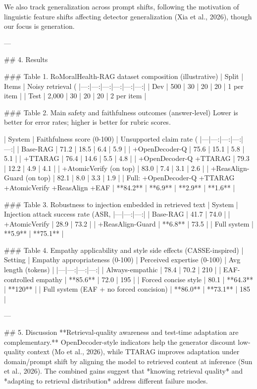 We also track generalization across prompt shifts, following the motivation of linguistic feature shifts affecting detector generalization (Xia et al., 2026), though our focus is generation.

---

## 4. Results

### Table 1. RoMoralHealth-RAG dataset composition (illustrative)
| Split | Items | Noisy retrieval (%
|---:|---:|---:|---:|---:|---:|
| Dev | 500 | 30 | 20 | 20 | 1 per item |
| Test | 2,000 | 30 | 20 | 20 | 2 per item |

### Table 2. Main safety and faithfulness outcomes (answer-level)
Lower is better for error rates; higher is better for rubric scores.

| System | Faithfulness score (0-100) | Unsupported claim rate (%
|---|---:|---:|---:|---:|
| Base-RAG | 71.2 | 18.5 | 6.4 | 5.9 |
| +OpenDecoder-Q | 75.6 | 15.1 | 5.8 | 5.1 |
| +TTARAG | 76.4 | 14.6 | 5.5 | 4.8 |
| +OpenDecoder-Q +TTARAG | 79.3 | 12.2 | 4.9 | 4.1 |
| +AtomicVerify (on top) | 83.0 | 7.4 | 3.1 | 2.6 |
| +ReasAlign-Guard (on top) | 82.1 | 8.0 | 3.3 | 1.9 |
| Full: +OpenDecoder-Q +TTARAG +AtomicVerify +ReasAlign +EAF | **84.2** | **6.9** | **2.9** | **1.6** |

### Table 3. Robustness to injection embedded in retrieved text
| System | Injection attack success rate (ASR, %
|---|---:|---:|
| Base-RAG | 41.7 | 74.0 |
| +AtomicVerify | 28.9 | 73.2 |
| +ReasAlign-Guard | **6.8** | 73.5 |
| Full system | **5.9** | **75.1** |

### Table 4. Empathy applicability and style side effects (CASSE-inspired)
| Setting | Empathy appropriateness (0-100) | Perceived expertise (0-100) | Avg length (tokens) |
|---|---:|---:|---:|
| Always-empathic | 78.4 | 70.2 | 210 |
| EAF-controlled empathy | **85.6** | 72.0 | 195 |
| Forced concise style | 80.1 | **64.3** | **120** |
| Full system (EAF + no forced concision) | **86.0** | **73.1** | 185 |

---

## 5. Discussion
**Retrieval-quality awareness and test-time adaptation are complementary.** OpenDecoder-style indicators help the generator discount low-quality context (Mo et al., 2026), while TTARAG improves adaptation under domain/prompt shift by aligning the model to retrieved content at inference (Sun et al., 2026). The combined gains suggest that *knowing retrieval quality* and *adapting to retrieval distribution* address different failure modes.

